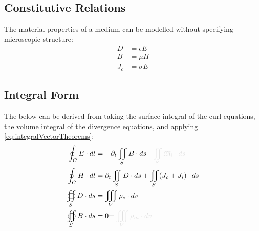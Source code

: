 \documentclass{article}
\numberwithin{equation}{section}
\begin{document}
        \subsection{Constitutive Relations} 
            The material properties of a medium can be modelled without specifying 
            microscopic structure:
            \begin{subequations}\label{eq:Constitutive}
                \begin{align}
                    D &= \epsilon E \label{eq:ConstitutiveElectric} \\ 
                    B &= \mu H \label{eq:ConstitutiveMagnetic} \\
                    J_c &= \sigma E \label{eq:ConstitutiveCurrentDensity}
                \end{align}
            \end{subequations}
        \subsection{Integral Form}
            The below can be derived from taking the surface integral of the curl
            equations, the volume integral of the divergence equations, and applying 
            \eqref{eq:integralVectorTheorems}:
            \begin{subequations}\label{eq:MaxwellIntegral}
                \begin{align}
                    \oint_C E \cdot dl &=  - \partial_t \iint_S B \cdot ds \begingroup 
                        \textcolor{vanish}{- \iint_S \mathfrak{M_i} \cdot ds} \endgroup 
                        \label{eq:MaxwellFaradayIntegral} \\
                    \oint_C H \cdot dl &= \partial_t \iint_S D \cdot ds + \iint_S 
                        ( J_c + J_i ) \cdot ds \label{eq:AmpereMaxwellIntegral} \\
                    \oiint_S D \cdot ds &= \iiint_V \rho_e \cdot dv 
                        \label{eq:GaussElectricIntegral} \\
                    \oiint_S B \cdot ds &= 0 \begingroup \textcolor{vanish}{= \iiint_V 
                        \rho_m \cdot dv} \endgroup \label{eq:GaussMagneticIntegral}
                \end{align}
            \end{subequations}
\end{document}
